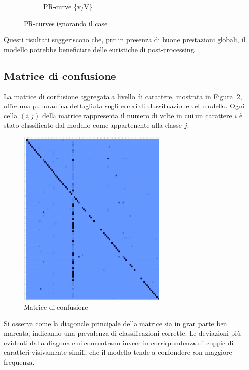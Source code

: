 \begin{figure}[htbp]
\begin{subfigure}[t]{0.32\textwidth}
        \caption{PR-curve \{v/V\}}
    \end{subfigure}
    \caption{PR-curves ignorando il case}
    \label{fig:pr-ignore}
\end{figure}

Questi risultati suggeriscono che, pur in presenza di buone prestazioni globali, il modello potrebbe beneficiare delle euristiche di post-processing.


\subsection{Matrice di confusione}
La matrice di confusione aggregata a livello di carattere, mostrata in Figura~\ref{fig:confusion_matrix}, offre una panoramica dettagliata sugli errori di classificazione del modello. Ogni cella \((i, j)\) della matrice rappresenta il numero di volte in cui un carattere \(i\) è stato classificato dal modello come appartenente alla classe \(j\).

\begin{figure}[htbp]
    \centering
    \includegraphics[width=0.65\textwidth]{images/confusion_matrix.png}
    \caption{Matrice di confusione}
    \label{fig:confusion_matrix}
\end{figure}

Si osserva come la diagonale principale della matrice sia in gran parte ben marcata, indicando una prevalenza di classificazioni corrette. Le deviazioni più evidenti dalla diagonale si concentrano invece in corrispondenza di coppie di caratteri visivamente simili, che il modello tende a confondere con maggiore frequenza.

